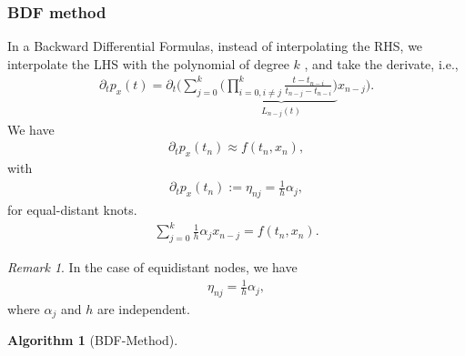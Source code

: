 \documentclass[a4paper,12pt,oneside,fleqn]{book}
\newtheorem{algorithm}{Algorithm}[section]
\theoremstyle{definition}
\theoremstyle{remark}
\newtheorem*{remark}{Remark}
\begin{document}
\subsubsection{BDF method}
In a Backward Differential Formulas, instead of interpolating the RHS, we interpolate the LHS with the polynomial of degree $k$ , and take the derivate, i.e., 
\begin{align*}
	\partial_t p_x(t) = \partial_t \bigg( \sum_{j = 0}^k \bigg( \underbrace{ \prod_{i = 0, i \neq j}^k \frac{t - t_{n -i}}{t_{n -j} - t_{n - i}}\bigg)}_{L_{n -j}(t)}x_{n - j} \bigg).  
\end{align*}
We have
\begin{align*}
	\partial_t p_x(t_n) \approx f(t_n, x_n),
\end{align*}
with 
\begin{align*}
	\partial_t p_x(t_n):= \eta_{nj} = \frac{1}{h}\alpha_j,
\end{align*}
for equal-distant knots. 
\begin{align*}
	\sum_{j = 0}^k \frac{1}{h} \alpha_{j} x_{n - j} = f(t_n, x_n). 
\end{align*}
\begin{remark}
In the case of equidistant nodes, we have
\begin{align*}
	\eta_{nj} = \frac{1}{h} \alpha_j, 
\end{align*}	
where $\alpha_j$ and $h$ are independent. 
\end{remark}

\begin{algorithm}[BDF-Method]
\end{algorithm}
\end{document}
